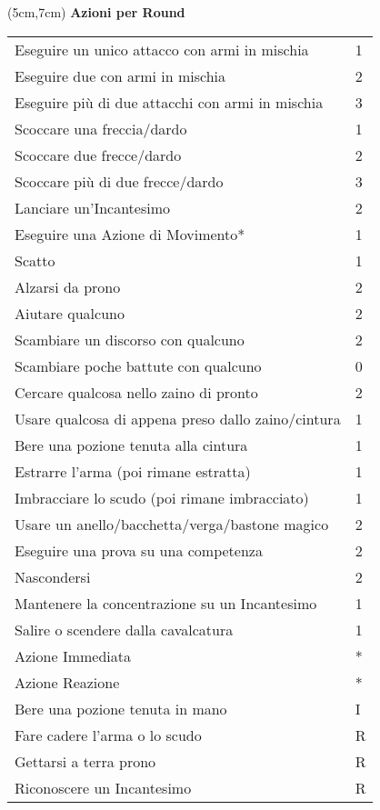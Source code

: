 \documentclass[a4paper,12 pt,openany]{book}
\begin{document}
\begin{textblock*}{11cm}(5cm,7cm) %
\textbf{Azioni per Round}

	\begin{tabular}{ll}
		Eseguire un unico attacco con armi in mischia      & 1\\
		Eseguire due con armi in mischia			       & 2\\
		Eseguire più di due attacchi con armi in mischia  & 3\\
		Scoccare una freccia/dardo                         & 1\\
		Scoccare due frecce/dardo                          & 2\\
		Scoccare più di due frecce/dardo                  & 3\\
		Lanciare un'Incantesimo                            & 2\\
		Eseguire una Azione di Movimento*                  & 1\\
		Scatto   						                   & 1\\
		Alzarsi da prono                                   & 2\\
		Aiutare qualcuno                                   & 2\\
		Scambiare un discorso con qualcuno                 & 2\\
		Scambiare poche battute con qualcuno               & 0\\
		Cercare qualcosa nello zaino di pronto             & 2\\
		Usare qualcosa di appena preso dallo zaino/cintura & 1\\
		Bere una pozione tenuta alla cintura               & 1\\
		Estrarre l'arma (poi rimane estratta)              & 1\\
		Imbracciare lo scudo (poi rimane imbracciato)      & 1\\
		Usare un anello/bacchetta/verga/bastone magico     & 2\\
		Eseguire una prova su una competenza               & 2\\
		Nascondersi										   & 2\\
		Mantenere la concentrazione su un Incantesimo      & 1\\
		Salire o scendere dalla cavalcatura				   & 1\\	
		Azione Immediata                                   & {*}\\
		Azione Reazione                                    & {*}\\
		Bere una pozione tenuta in mano     	           & I\\
		Fare cadere l'arma o lo scudo					   & R\\
		Gettarsi a terra prono							   & R\\	
		Riconoscere un Incantesimo						   & R\\
	\end{tabular}
	
	\end{textblock*}
\end{document}
